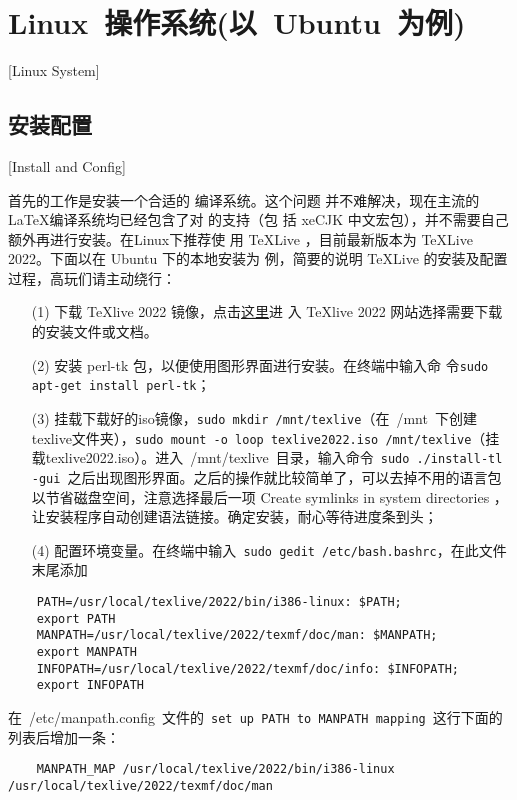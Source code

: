 \section{Linux~操作系统(以~Ubuntu~为例)}[Linux System]

\subsection{安装配置}[Install and Config]

首先的工作是安装一个合适的 \XeTeX{}编译系统。这个问题
并不难解决，现在主流的 \LaTeX{}编译系统均已经包含了对 \XeTeX{}的支持（包
括 xeCJK 中文宏包），并不需要自己额外再进行安装。在Linux下推荐使
用 \TeX{}Live ，目前最新版本为 \TeX{}Live 2022。下面以在 Ubuntu 下的本地安装为
例，简要的说明 \TeX{}Live 的安装及配置过程，高玩们请主动绕行：

\begin{enumerate}
  \item[(1)] 下载 \TeX{}live 2022 镜像，点击\href{https://tug.org/texlive/}{这里}进    入 \TeX{}live 2022 网站选择需要下载的安装文件或文档。
  \item[(2)] 安装 perl-tk 包，以便使用图形界面进行安装。在终端中输入命    令\texttt{sudo apt-get install perl-tk}；
  \item[(3)] 挂载下载好的iso镜像，\texttt{sudo mkdir /mnt/texlive}（在~{/mnt}~下创建texlive文件夹），\texttt{sudo mount -o loop texlive2022.iso  /mnt/texlive}（挂载texlive2022.iso）。进入~/mnt/texlive~目录，输入命令~\texttt{sudo ./install-tl -gui}~之后出现图形界面。之后的操作就比较简单了，可以去掉不用的语言包以节省磁盘空间，注意选择最后一项 Create symlinks in system directories ，让安装程序自动创建语法链接。确定安装，耐心等待进度条到头；
  \item[(4)] 配置环境变量。在终端中输入~\texttt{sudo gedit /etc/bash.bashrc}，在此文件末尾添加
\end{enumerate}

\begin{lstlisting}
    PATH=/usr/local/texlive/2022/bin/i386-linux: $PATH;
    export PATH
    MANPATH=/usr/local/texlive/2022/texmf/doc/man: $MANPATH;
    export MANPATH
    INFOPATH=/usr/local/texlive/2022/texmf/doc/info: $INFOPATH;
    export INFOPATH
  \end{lstlisting}

在~{/etc/manpath.config}~文件的~\texttt{set up PATH to  MANPATH mapping}~这行下面的列表后增加一条：

\begin{lstlisting}
    MANPATH_MAP /usr/local/texlive/2022/bin/i386-linux  /usr/local/texlive/2022/texmf/doc/man
  \end{lstlisting}

